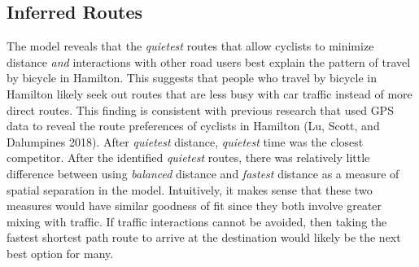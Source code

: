 \documentclass[smallextended]{svjour3}       %
\begin{document}
\hypertarget{inferred-routes}{%
\subsection{Inferred Routes}\label{inferred-routes}}

The model reveals that the \emph{quietest} routes that allow cyclists to
minimize distance \emph{and} interactions with other road users best
explain the pattern of travel by bicycle in Hamilton. This suggests that
people who travel by bicycle in Hamilton likely seek out routes that are
less busy with car traffic instead of more direct routes. This finding
is consistent with previous research that used GPS data to reveal the
route preferences of cyclists in Hamilton (Lu, Scott, and Dalumpines
2018). After \emph{quietest} distance, \emph{quietest} time was the
closest competitor. After the identified \emph{quietest} routes, there
was relatively little difference between using \emph{balanced} distance
and \emph{fastest} distance as a measure of spatial separation in the
model. Intuitively, it makes sense that these two measures would have
similar goodness of fit since they both involve greater mixing with
traffic. If traffic interactions cannot be avoided, then taking the
fastest shortest path route to arrive at the destination would likely be
the next best option for many.
\end{document}
